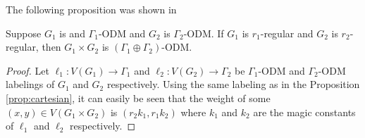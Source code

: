 The following proposition was shown in \cite{anholcerGroupDistanceMagic2014}

\begin{proposition}
Suppose \(G_1\) is and \(\Gamma_1\)-ODM and \(G_2\) is \(\Gamma_2\)-ODM.
If \(G_1\) is \(r_1\)-regular and \(G_2\) is \(r_2\)-regular,
then \(G_1 \times G_2\) is \((\Gamma_1 \oplus \Gamma_2)\)-ODM.
\end{proposition}

\begin{proof}
Let \(\ell_1: V(G_1) \rightarrow \Gamma_1\) and \(\ell_2: V(G_2) \rightarrow \Gamma_2\) be \(\Gamma_1\)-ODM and \(\Gamma_2\)-ODM labelings of \(G_1\) and \(G_2\) respectively.
Using the same labeling as in the Proposition \ref{prop:cartesian},
it can easily be seen that the weight of some \((x,y) \in V(G_1 \times G_2)\) is \((r_2 k_1, r_1 k_2)\)
where \(k_1\) and \(k_2\) are the magic constants of \(\ell_1\) and \(\ell_2\) respectively.
\end{proof}